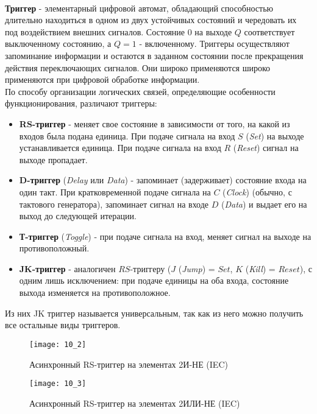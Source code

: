 \\\textbf{Триггер} - элементарный цифровой автомат, обладающий способностью длительно находиться в одном из двух устойчивых состояний и чередовать их под воздействием внешних сигналов. Состояние $0$ на выходе $Q$ соответствует выключенному состоянию, а $Q = 1$ - включенному. Триггеры осуществляют запоминание информации и остаются в заданном состоянии после прекращения действия переключающих сигналов. Они широко применяются широко применяются при цифровой обработке информации.
\\По способу организации логических связей, определяющие особенности функционирования, различают триггеры:
\begin{itemize}
  \item \textbf{RS-триггер} - меняет свое состояние в зависимости от того, на какой из входов была подана единица. При подаче сигнала на вход $S$ (\emph{Set}) на выходе устанавливается единица. При подаче сигнала на вход $R$ (\emph{Reset}) сигнал на выходе пропадает.
  \item  \textbf{D-триггер} (\emph{Delay} или \emph{Data}) - запоминает (задерживает) состояние входа на один такт. При кратковременной подаче сигнала на $C$ (\emph{Clock}) (обычно, с тактового генератора), запоминает сигнал на входе $D$ (\emph{Data}) и выдает его на выход до следующей итерации.
  \item \textbf{Т-триггер} (\emph{Toggle}) - при подаче сигнала на вход, меняет сигнал на выходе на противоположный.
  \item \textbf{JK-триггер} - аналогичен $RS$-триггеру ($J$ (\emph{Jump}) = $Set$, $K$ (\emph{Kill}) = $Reset$), с одним лишь исключением: при подаче единицы на оба входа, состояние выхода изменяется на противоположное.
\end{itemize}
Из них JK триггер называется универсальным, так как из него можно получить все остальные виды триггеров.
\begin{figure}[!h]
\begin{minipage}{5cm}
\texttt{[image: 10\_2]}
\caption{Асинхронный RS-триггер на элементах 2И-НЕ (IEC)}
\end{minipage}
\hfill
\begin{minipage}{5cm}
\texttt{[image: 10\_3]}
\caption{Асинхронный RS-триггер на элементах 2ИЛИ-НЕ (IEC)}
\label{tag:RS_NOR}
\end{minipage}
\end{figure}

